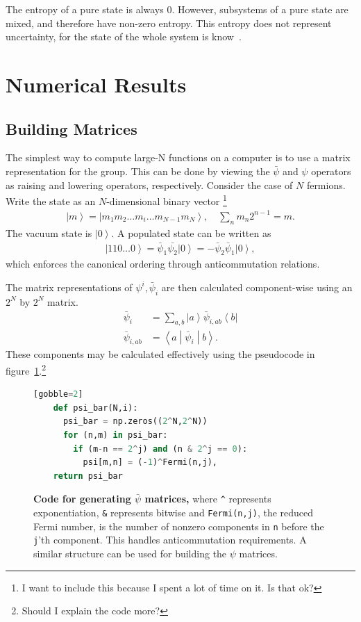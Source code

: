 \documentclass[12pt]{article} %
\newcommand{\ket}[1]{\left|#1\right\rangle}
\newcommand{\bra}[1]{\left\langle#1\right|}
\newcommand{\brakett}[3]{\left\langle#1\middle|#2\middle|#3\right\rangle}
\newcommand{\nn}{\nonumber\\}
\begin{document}
The entropy of a pure state is always 0. However, subsystems of a pure state are mixed, and therefore have non-zero entropy. This entropy does not represent uncertainty, for the state of the whole system is know~\cite{janzing09}.

\section{Numerical Results}

\subsection{Building Matrices}\emph{}

The simplest way to compute large-N functions on a computer is to use a matrix representation for the group. This can be done by viewing the $\bar \psi$ and $\psi$ operators as raising and lowering operators, respectively. Consider the case of $N$ fermions. Write the state as an $N$-dimensional binary vector \footnote{I want to include this because I spent a lot of time on it. Is that ok?}
\begin{align}
\ket{m} = \ket{m_1m_2\dots m_i\dots m_{N-1}m_N}, \quad\sum_nm_n2^{n-1} =
	m.\label{eqn:2Nstate}
\end{align}
The vacuum state is $\ket{0}$. A populated state can be written as
\begin{align}
\ket{110\dots 0} = \bar\psi_1\bar{\psi_2}\ket{0} =-\bar\psi_2\bar\psi_1\ket{0},
\end{align}
which enforces the canonical ordering through anticommutation relations. 

The matrix representations of $\psi^i, \bar \psi_i$ are then calculated component-wise using an $2^N$ by $2^N$ matrix.
\begin{align}
\bar\psi_i &= \sum_{a,b}\ket{a}\bar\psi_{i,ab}\bra{b}\nn
\bar\psi_{i,ab} &= \brakett{a}{\bar\psi_i}{b}.\label{eqn:comps}
\end{align}
These components may be calculated effectively using the pseudocode in figure~\ref{code:psibar}.\footnote{Should I explain the code more?}

\begin{figure}[ht]
	\begin{lstlisting}[language=python][gobble=2]
    def psi_bar(N,i):
      psi_bar = np.zeros((2^N,2^N))
      for (n,m) in psi_bar:
        if (m-n == 2^j) and (n & 2^j == 0): 
          psi[m,n] = (-1)^Fermi(n,j),
    return psi_bar
		\end{lstlisting}
	\cprotect\caption{\textbf{Code for generating $\bar \psi$ matrices,} where \verb|^| represents exponentiation, \verb|&| represents bitwise and \verb|Fermi(n,j)|, the reduced Fermi number, is the number of nonzero components in \verb|n| before the \verb|j|'th component. This handles anticommutation requirements. A similar structure can be used for building the $\psi$ matrices.}
	\label{code:psibar}
\end{figure}
\end{document}
